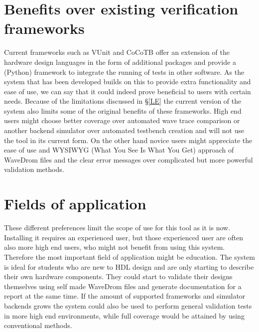 \section{Benefits over existing verification frameworks}
Current frameworks such as VUnit and CoCoTB offer an extension of the hardware design languages in the form of additional packages and provide a (Python) framework to integrate the running of tests in other software. As the system that has been developed builds on this to provide extra functionality and ease of use, we can say that it could indeed prove beneficial to users with certain needs. Because of the limitations discussed in §\ref{LE} the current version of the system also limits some of the original benefits of these frameworks.
\npar
High end users might choose better coverage over automated wave trace comparison or another backend simulator over automated testbench creation and will not use the tool in its current form. On the other hand novice users might appreciate the ease of use and WYSIWYG (What You See Is What You Get) approach of WaveDrom files and the clear error messages over complicated but more powerful validation methods.
\section{Fields of application}
These different preferences limit the scope of use for this tool as it is now. Installing it requires an experienced user, but those experienced user are often also more high end users, who might not benefit from using this system. Therefore the most important field of application might be education. The system is ideal for students who are new to HDL design and are only starting to describe their own hardware components. They could start to validate their designs themselves using self made WaveDrom files and generate documentation for a report at the same time.
\npar
If the amount of supported frameworks and simulator backends grows the system could also be used to perform general validation tests in more high end environments, while full coverage would be attained by using conventional methods.
